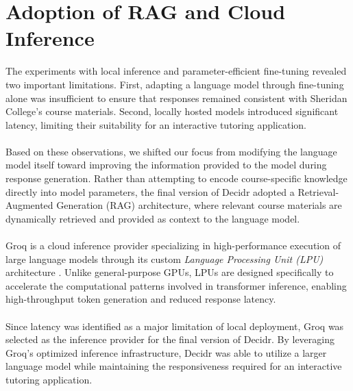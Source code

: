 \documentclass[12pt, a4paper]{report}
\begin{document}
\section{Adoption of RAG and Cloud Inference}
The experiments with local inference and parameter-efficient fine-tuning revealed two important limitations. First, adapting a language model through fine-tuning alone was insufficient to ensure that responses remained consistent with Sheridan College's course materials. Second, locally hosted models introduced significant latency, limiting their suitability for an interactive tutoring application.~\\~\\
Based on these observations, we shifted our focus from modifying the language model itself toward improving the information provided to the model during response generation. Rather than attempting to encode course-specific knowledge directly into model parameters, the final version of Decidr adopted a Retrieval-Augmented Generation (RAG) architecture, where relevant course materials are dynamically retrieved and provided as context to the language model.~\\~\\
Groq is a cloud inference provider specializing in high-performance execution of large language models through its custom \textit{Language Processing Unit (LPU)} architecture \cite{groq2024}. Unlike general-purpose GPUs, LPUs are designed specifically to accelerate the computational patterns involved in transformer inference, enabling high-throughput token generation and reduced response latency.~\\~\\
Since latency was identified as a major limitation of local deployment, Groq was selected as the inference provider for the final version of Decidr. By leveraging Groq's optimized inference infrastructure, Decidr was able to utilize a larger language model while maintaining the responsiveness required for an interactive tutoring application.
\end{document}
